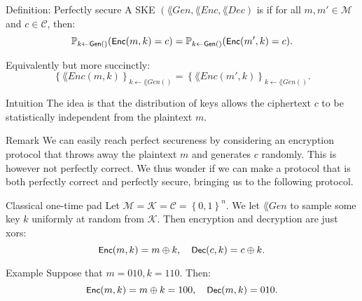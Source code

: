 \documentclass[a4paper]{article}
\begin{document}
\begin{parag}{Definition: Perfectly secure}
    A SKE $\left(\lang{Gen}, \lang{Enc}, \lang{Dec}\right)$ is  if for all $m, m' \in \mathcal{M}$ and $c \in \mathcal{C}$, then:
    \[\prob_{k \leftarrow \lang{Gen}\left(\right)}\left(\lang{Enc}\left(m, k\right) = c\right) = \prob_{k \leftarrow \lang{Gen}\left(\right)}\left(\lang{Enc}\left(m', k\right) = c\right).\]

    Equivalently but more succinctly: 
    \[\left\{\lang{Enc}\left(m, k\right)\right\}_{k \leftarrow \lang{Gen}\left(\right)} = \left\{\lang{Enc}\left(m', k\right)\right\}_{k \leftarrow \lang{Gen}\left(\right)}.\]

    \begin{subparag}{Intuition}
        The idea is that the distribution of keys allows the ciphertext $c$ to be statistically independent from the plaintext $m$.
    \end{subparag}

    \begin{subparag}{Remark}
        We can easily reach perfect secureness by considering an encryption protocol that throws away the plaintext $m$ and generates $c$ randomly. This is however not perfectly correct. We thus wonder if we can make a protocol that is both perfectly correct and perfectly secure, bringing us to the following protocol.
    \end{subparag}
\end{parag}

\begin{parag}{Classical one-time pad}
    Let $\mathcal{M} = \mathcal{K} = \mathcal{C} = \left\{0, 1\right\}^n$. We let $\lang{Gen}$ to sample some key $k$ uniformly at random from $\mathcal{K}$. Then encryption and decryption are just xors: 
    \[\lang{Enc}\left(m, k\right) = m \oplus k, \mathspace \lang{Dec}\left(c, k\right) = c \oplus k.\]
     
    \begin{subparag}{Example}
        Suppose that $m = 010, k= 110$. Then: 
        \[\lang{Enc}\left(m, k\right) = m \oplus k = 100, \mathspace \lang{Dec}\left(m, k\right) = 010.\]
    \end{subparag}
\end{parag}
\end{document}
